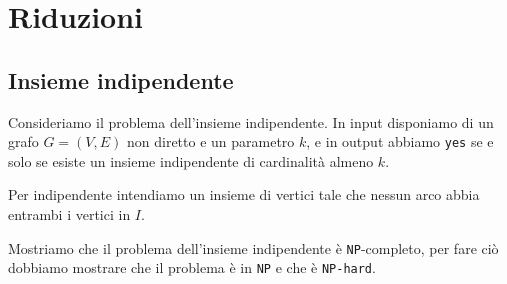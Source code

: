 \chapter{Riduzioni}
\section{Insieme indipendente}
Consideriamo il problema dell'insieme indipendente.
In input disponiamo di un grafo $G = (V,E)$ non diretto e un parametro $k$, e 
in output abbiamo \texttt{yes} se e solo se esiste un insieme indipendente di
cardinalità almeno $k$.

Per indipendente intendiamo un insieme di vertici tale che nessun arco abbia entrambi
i vertici in $I$.

Mostriamo che il problema dell'insieme indipendente è \texttt{NP}-completo, per fare ciò
dobbiamo mostrare che il problema è in \texttt{NP} e che è \texttt{NP-hard}.

